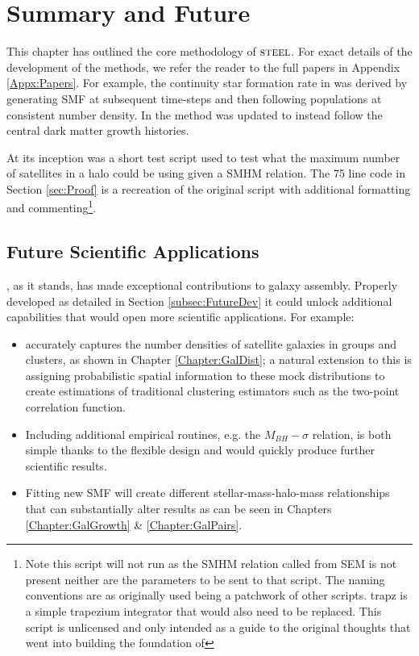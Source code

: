 \section{Summary and Future}

This chapter has outlined the core methodology of $\textsc{steel}$. For exact details of the development of the methods, we refer the reader to the full papers in Appendix \ref{Appx:Papers}. For example, the continuity star formation rate in  was derived by generating SMF at subsequent time-steps and then following populations at consistent number density. In  the method was updated to instead follow the central dark matter growth histories. 

At its inception \steel was a short test script used to test what the maximum number of satellites in a halo could be using given a SMHM relation. The 75 line code in Section \ref{sec:Proof} is a recreation of the original script with additional formatting and commenting\footnote{Note this script will not run as the SMHM relation called from SEM is not present neither are the parameters to be sent to that script. The naming conventions are as originally used being a patchwork of other scripts. trapz is a simple trapezium integrator that would also need to be replaced. This script is unlicensed and only intended as a guide to the original thoughts that went into building the foundation of \steel}.

\subsection{Future Scientific Applications}
\steel, as it stands, has made exceptional contributions to galaxy assembly. Properly developed as detailed in Section \ref{subsec:FutureDev} it could unlock additional capabilities that would open more scientific applications. For example: 
\begin{itemize}
    \item \steel accurately captures the number densities of satellite galaxies in groups and clusters, as shown in Chapter \ref{Chapter:GalDist}; a natural extension to this is assigning probabilistic spatial information to these mock distributions to create estimations of traditional clustering estimators such as the two-point correlation function. 
    \item Including additional empirical routines, e.g. the $M_{BH}-\sigma$ relation, is both simple thanks to the flexible design and would quickly produce further scientific results.
    \item Fitting new SMF will create different stellar-mass-halo-mass relationships that can substantially alter results as can be seen in Chapters \ref{Chapter:GalGrowth} \& \ref{Chapter:GalPairs}.
\end{itemize}



